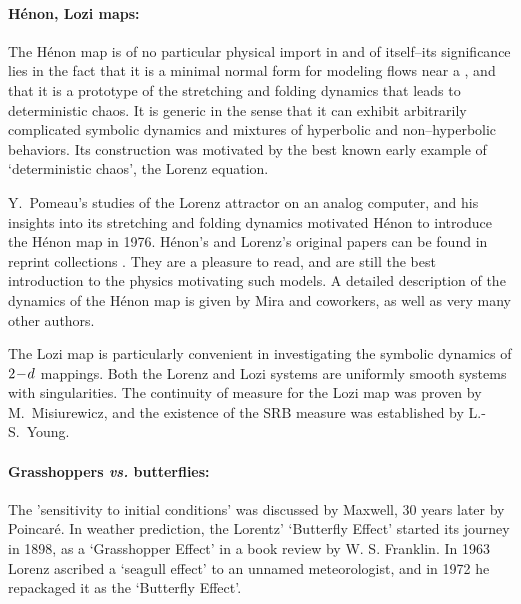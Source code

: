 \paragraph{H\'enon, Lozi maps:}
The H\'enon map%
is of no particular physical
import in and of itself--its significance lies in
the fact that it is a minimal normal form for modeling flows near a
\snbif,
and that it is a prototype of the stretching and folding dynamics that
leads to deterministic chaos.  It is generic in the sense that it can
exhibit arbitrarily complicated symbolic dynamics and mixtures of
hyperbolic and non--hyperbolic behaviors.  Its construction was
motivated by the best known early example of `deterministic chaos',
the Lorenz equation.

 Y.~Pomeau's studies of the Lorenz
attractor on an analog computer, and his insights into its stretching
and folding dynamics motivated H\'enon to introduce
the H\'enon map in
1976.
H\'enon's and Lorenz's original papers can be found in reprint
collections .  They are a pleasure to read, and
are still the best introduction to the physics
motivating such models.
A detailed description of the dynamics of the H\'enon map is
given by Mira and coworkers, as well as very many other
authors.

The Lozi map is particularly convenient in investigating the
symbolic dynamics of $2\!-\!d$ mappings.  Both the Lorenz and Lozi
systems are uniformly smooth systems with singularities.
The continuity of measure
for the Lozi map
was proven by M.~Misiurewicz,
and the existence of the SRB measure was established by L.-S.~Young.


\paragraph{\protect Grasshoppers {\em vs.} butterflies:}
The 'sensitivity to initial conditions' was
discussed by Maxwell, 30 years later by Poincar\'e.
In weather prediction, the
Lorentz' `Butterfly Effect' started its journey in
1898, as a `Grasshopper Effect' in a book review by
W. S. Franklin.  In 1963 Lorenz
ascribed a `seagull effect' to an unnamed meteorologist,
and in 1972 he repackaged it as the `Butterfly Effect'.

